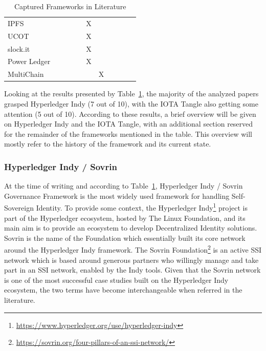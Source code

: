\begin{table}[!ht]
\begin{tabular}{|p{36mm}|cccccccccc|}
             IPFS                      &     &     &     &     &  X   & ~   &     &     &     &     \\
             UCOT                      &     &     &     &     &  X   & ~   &     &     &     &     \\
             slock.it                  &     &     &     &     &   X  & ~   &     &     &     &     \\
             Power Ledger              &     &     &     &     &  X   & ~   &     &     &     &     \\
             MultiChain                &     &     &     &     &      &  X  &     &     &     &     \\
         \hline
    \end{tabular}
    \caption{Captured Frameworks in Literature}
    \label{tab:frameworks}
\end{table}

Looking at the results presented by Table~\ref{tab:frameworks}, the majority of the analyzed papers grasped Hyperledger Indy (7 out of 10), with the IOTA Tangle also getting some attention (5 out of 10). According to these results, a brief overview will be given on Hyperledger Indy and the IOTA Tangle, with an additional section reserved for the remainder of the frameworks mentioned in the table. This overview will mostly refer to the history of the framework and its current state.

\subsubsection{Hyperledger Indy / Sovrin}
\label{subsubsec:hyperledger_indy_sovrin}

At the time of writing and according to Table~\ref{tab:frameworks}, Hyperledger Indy / Sovrin Governance Framework is the most widely used framework for handling Self-Sovereign Identity. To provide some context, the Hyperledger Indy\footnote{\url{https://www.hyperledger.org/use/hyperledger-indy}} project is part of the Hyperledger ecosystem, hosted by The Linux Foundation, and its main aim is to provide an ecosystem to develop Decentralized Identity solutions. 
Sovrin is the name of the Foundation which essentially built its core network around the Hyperledger Indy framework. The Sovrin Foundation\footnote{\url{https://sovrin.org/four-pillars-of-an-ssi-network/}} is an active SSI network which is based around generous partners who willingly manage and take part in an SSI network, enabled by the Indy tools. Given that the Sovrin network is one of the most successful case studies built on the Hyperledger Indy ecosystem, the two terms have become interchangeable when referred in the literature.

